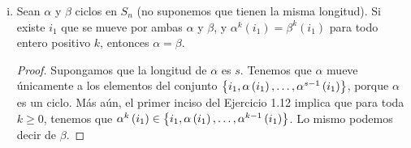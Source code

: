 \begin{enumerate}[(i)]
\begin{proof}
            Supongamos que para algún \( k\geq 0 \) se tiene que si \( \beta \) mueve a 
            \( i \) entonces \( \alpha^k ( i ) = \beta^k ( i ) \).
            Por el Lemma \ref{muevela-tambien} tenemos que \( \beta \) mueve a \( \beta^k ( i ) \).
            Entonces usando la base inductiva (caso \( k=1 \)) tenemos que 
            \begin{align*}
                \beta^{k+1} ( i ) 
                &=
                \beta \left( \beta^k ( i ) \right) \\
                &=
                \alpha \left( \beta^k ( i ) \right).
            \end{align*}
            Pero por la hipótesis de inducción \( \alpha^k ( i ) = \beta^k ( i ) \), por lo que 
            \begin{align*}
                \beta^{k+1} \left( i \right) 
                &=
                \alpha \left( \beta^k ( i ) \right) \\
                &=
                \alpha \left( \alpha^k ( i ) \right) \\
                &=
                \alpha^{k+1} ( i ).
            \end{align*}
            Por el principio de inducción concluimos que \( \alpha^k ( i ) = 
            \beta^k ( i )\), para toda \( k\geq 0 \).
        \end{proof}
    \item
        Sean \( \alpha \) y \( \beta \) ciclos en \( S_n \) (no suponemos que 
        tienen la misma longitud). Si existe \( i_1 \) que se mueve por ambas 
        \( \alpha \) y \( \beta \), y \( \alpha^k \left( i_1 \right) = \beta^k \left( i_1 \right) \) 
        para todo entero positivo \( k  \), entonces \( \alpha = \beta \).
        \begin{proof}
            Supongamos que la longitud de \( \alpha \) es \( s \).
            Tenemos que \( \alpha \) mueve únicamente a los elementos del conjunto
            \( \left\{ i_1,\alpha \left( i_1 \right), \ldots, \alpha^{s-1} \left( i_1 \right) \right\} \), porque
            \( \alpha \) es un ciclo. Más aún, el primer inciso del Ejercicio 1.12 implica que 
            para toda \( k\geq 0 \), tenemos que \( \alpha^k \left( i_1 \right) \in 
            \left\{ i_1,\alpha \left( i_1 \right), \ldots, \alpha^{k-1} \left( i_1 \right) \right\}\).
            Lo mismo podemos decir de \( \beta \).


\end{proof}
\end{enumerate}
